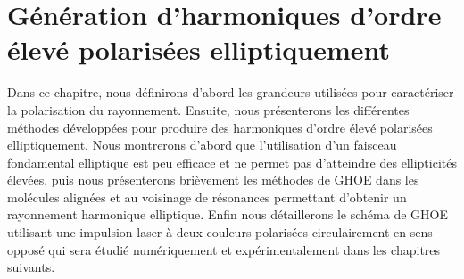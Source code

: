 
\chapter{Génération d'harmoniques d'ordre élevé polarisées elliptiquement}
\label{chap:GHOE_elliptiques}
Dans ce chapitre, nous définirons d'abord les grandeurs utilisées pour caractériser la polarisation du rayonnement. Ensuite, nous présenterons les différentes méthodes développées pour produire des harmoniques d'ordre élevé polarisées elliptiquement. Nous montrerons d'abord que l'utilisation d'un faisceau fondamental elliptique est peu efficace et ne permet pas d'atteindre des ellipticités élevées, puis nous présenterons brièvement les méthodes de GHOE dans les molécules alignées et au voisinage de résonances permettant d'obtenir un rayonnement harmonique elliptique. Enfin nous détaillerons le schéma de GHOE utilisant une impulsion laser à deux couleurs polarisées circulairement en sens opposé qui sera étudié numériquement et expérimentalement dans les chapitres suivants. 

